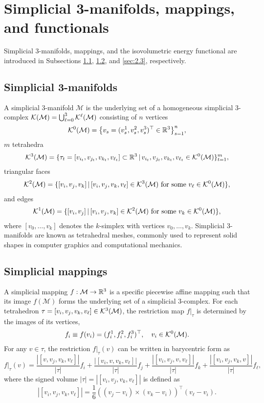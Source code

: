 \documentclass[11pt,a4paper]{article}
\begin{document}
\section{Simplicial 3-manifolds, mappings, and functionals}
\label{sec:2}

Simplicial 3-manifolds, mappings, and the isovolumetric energy functional are introduced in Subsections \ref{sec:2.1}, \ref{sec:2.2}, and \ref{sec:2.3}, respectively.

\subsection{Simplicial 3-manifolds}
\label{sec:2.1}

A simplicial 3-manifold $\mathcal{M}$ is the underlying set of a homogeneous simplicial 3-complex $\mathcal{K}(\mathcal{M}) = \bigcup_{\ell=0}^3 \mathcal{K}^\ell(\mathcal{M})$ consisting of $n$ vertices
\begin{equation*}
\mathcal{K}^0(\mathcal{M}) = \big\lbrace v_s = (v_s^1, v_s^2, v_s^3)^{\top} \in \mathbb{R}^3 \big\rbrace_{s=1}^n,
\end{equation*}
$m$ tetrahedra
\begin{equation*}
\mathcal{K}^3(\mathcal{M}) = \lbrace \tau_t = [v_{i_t}, v_{j_t}, v_{k_t}, v_{\ell_t}] \subset \mathbb{R}^3 \,|\, v_{i_t}, v_{j_t}, v_{k_t}, v_{\ell_t} \in \mathcal{K}^0(\mathcal{M}) \rbrace_{t=1}^m,
\end{equation*}
triangular faces
\begin{equation*}
\mathcal{K}^2(\mathcal{M}) = \lbrace [v_i, v_j, v_k] \,| \, [v_i, v_j, v_k, v_\ell] \in \mathcal{K}^3(\mathcal{M}) \text{ for some } v_\ell \in \mathcal{K}^0(\mathcal{M}) \rbrace,
\end{equation*}
and edges
\begin{equation*}
\mathcal{K}^1(\mathcal{M}) = \lbrace [v_i, v_j] \,|\, [v_i, v_j, v_k] \in \mathcal{K}^2(\mathcal{M}) \text{ for some } v_k \in \mathcal{K}^0(\mathcal{M}) \rbrace,
\end{equation*}
where $\left[{v}_0, \ldots, {v}_k\right]$ denotes the $k$-simplex with vertices ${v}_0, \ldots, {v}_k$. Simplicial 3-manifolds are known as tetrahedral meshes, commonly used to represent solid shapes in computer graphics and computational mechanics.

\subsection{Simplicial mappings}
\label{sec:2.2}
A simplicial mapping $f:\mathcal{M} \to \mathbb{R}^3$ is a specific piecewise affine mapping such that its image $f(\mathcal{M})$ forms the underlying set of a simplicial 3-complex. 
For each tetrahedron $\tau = [v_i, v_j, v_k, v_\ell] \in \mathcal{K}^3(\mathcal{M})$, the restriction map $f|_\tau$ is determined by the images of its vertices,
\[
f_i \equiv f(v_i) = (f^1_i, f^2_i, f^3_i)^\top, \quad v_i \in \mathcal{K}^0(\mathcal{M}). 
\]
For any $v \in \tau$, the restriction $f|_{\tau}(v)$ can be written in barycentric form as
$$
f|_{\tau}(v) = \frac{|[v,v_{j},v_{k},v_{\ell}]|}{|\tau|} f_{i} + \frac{|[v_{i},v,v_{k},v_{\ell}]|}{|\tau|} f_{j} + \frac{|[v_{i},v_{j},v,v_{\ell}]|}{|\tau|} f_{k} + \frac{|[v_{i},v_{j},v_{k},v]|}{|\tau|} f_{\ell},
$$
where the signed volume $|\tau| = |[v_i, v_j, v_k, v_\ell]|$ is defined as
\begin{equation*}
|[v_i, v_j, v_k, v_\ell]| = \frac{1}{6}  ((v_j-v_i)\times(v_k-v_i))^\top(v_\ell-v_i).
\end{equation*} 
\end{document}
